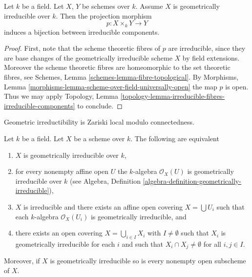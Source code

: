 \begin{lemma}
\label{lemma-bijection-irreducible-components}
Let $k$ be a field.
Let $X$, $Y$ be schemes over $k$.
Assume $X$ is geometrically irreducible over $k$.
Then the projection morphism
$$
p : X \times_k Y \longrightarrow Y
$$
induces a bijection between irreducible components.
\end{lemma}

\begin{proof}
First, note that the scheme theoretic fibres of $p$ are irreducible,
since they are base changes of the geometrically irreducible scheme $X$
by field extensions. Moreover the scheme theoretic fibres are
homeomorphic to the set theoretic fibres, see
Schemes, Lemma \ref{schemes-lemma-fibre-topological}.
By Morphisms, Lemma \ref{morphisms-lemma-scheme-over-field-universally-open}
the map $p$ is open.
Thus we may apply Topology,
Lemma \ref{topology-lemma-irreducible-fibres-irreducible-components}
to conclude.
\end{proof}

\begin{lemma}
\label{lemma-geometrically-irreducible-local}
\begin{slogan}
Geometric irreductibility is Zariski local modulo connectedness.
\end{slogan}
Let $k$ be a field. Let $X$ be a scheme over $k$.
The following are equivalent
\begin{enumerate}
\item $X$ is geometrically irreducible over $k$,
\item for every nonempty affine open $U$ the $k$-algebra $\mathcal{O}_X(U)$
is geometrically irreducible over $k$ (see
Algebra, Definition \ref{algebra-definition-geometrically-irreducible}),
\item $X$ is irreducible and there exists an affine open covering
$X = \bigcup U_i$ such that each $k$-algebra $\mathcal{O}_X(U_i)$ is
geometrically irreducible, and
\item there exists an open covering $X = \bigcup_{i \in I} X_i$
with $I \not = \emptyset$ such
that $X_i$ is geometrically irreducible for each $i$ and such that
$X_i \cap X_j \not = \emptyset$ for all $i, j \in I$.
\end{enumerate}
Moreover, if $X$ is geometrically irreducible so is every nonempty
open subscheme of $X$.
\end{lemma}

